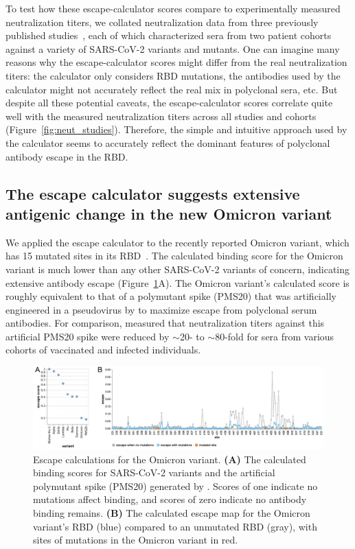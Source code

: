 \documentclass[9pt,twocolumn,twoside]{gsajnl_modified}
\begin{document}
To test how these escape-calculator scores compare to experimentally measured neutralization titers, we collated neutralization data from three previously published studies~\citep{lucas2021impact,uriu2021neutralization,wang2021antibody,}, each of which characterized sera from two patient cohorts against a variety of SARS-CoV-2 variants and mutants.
One can imagine many reasons why the escape-calculator scores might differ from the real neutralization titers: the calculator only considers RBD mutations, the antibodies used by the calculator might not accurately reflect the real mix in polyclonal sera, etc.
But despite all these potential caveats, the escape-calculator scores correlate quite well with the measured neutralization titers across all studies and cohorts (Figure~\ref{fig:neut_studies}).
Therefore, the simple and intuitive approach used by the calculator seems to accurately reflect the dominant features of polyclonal antibody escape in the RBD.

\subsection{The escape calculator suggests extensive antigenic change in the new Omicron variant}
We applied the escape calculator to the recently reported Omicron variant, which has 15 mutated sites in its RBD~\citep{ngs-sa2021update,deoliveira2021tweet}.
The calculated binding score for the Omicron variant is much lower than any other SARS-CoV-2 variants of concern, indicating extensive antibody escape (Figure~\ref{fig:Omicron}A).
The Omicron variant's calculated score is roughly equivalent to that of a polymutant spike (PMS20) that was artificially engineered in a pseudovirus by \citet{schmidt2021high} to maximize escape from polyclonal serum antibodies.
For comparison, \citet{schmidt2021high} measured that neutralization titers against this artificial PMS20 spike were reduced by $\sim$20- to $\sim$80-fold for sera from various cohorts of vaccinated and infected individuals.

\begin{figure}
\includegraphics[width=\linewidth]{figures/Omicron/Omicron.pdf}
\caption{Escape calculations for the Omicron variant.
{\bf (A)} The calculated binding scores for SARS-CoV-2 variants and the artificial polymutant spike (PMS20) generated by \citet{schmidt2021high}.
Scores of one indicate no mutations affect binding, and scores of zero indicate no antibody binding remains.
{\bf (B)} The calculated escape map for the Omicron variant's RBD (blue) compared to an unmutated RBD (gray), with sites of mutations in the Omicron variant in red.
}
\label{fig:Omicron}
\end{figure}
\end{document}
